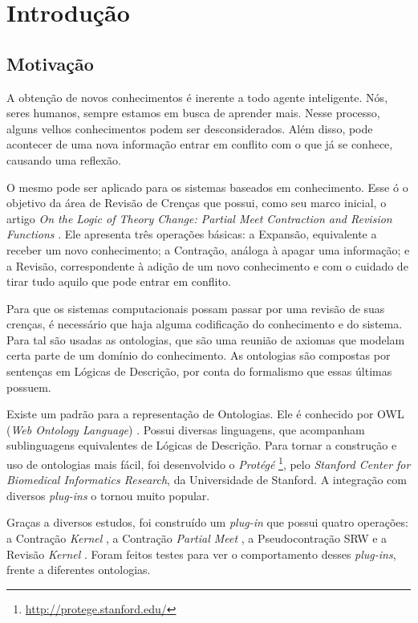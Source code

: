 \chapter{Introdução}

\section{Motivação}

A obtenção de novos conhecimentos é inerente a todo agente inteligente. Nós, seres humanos, sempre estamos em busca de aprender mais. Nesse processo, alguns velhos conhecimentos podem ser desconsiderados. Além disso, pode acontecer de uma nova informação entrar em conflito com o que já se conhece, causando uma reflexão.

O mesmo pode ser aplicado para os sistemas baseados em conhecimento. Esse ó o objetivo da área de Revisão de Crenças que possui, como seu marco inicial, o artigo \textit{On the Logic of Theory Change: Partial Meet Contraction and Revision Functions} \citep{revisaoAGM}. Ele apresenta três operações básicas: a Expansão, equivalente a receber um novo conhecimento; a Contração, análoga à apagar uma informação; e a Revisão, correspondente à adição de um novo conhecimento e com o cuidado de tirar tudo aquilo que pode entrar em conflito.

Para que os sistemas computacionais possam passar por uma revisão de suas crenças, é necessário que haja alguma codificação do conhecimento e do sistema. Para tal são usadas as ontologias, que são uma reunião de axiomas que modelam certa parte de um domínio do conhecimento. As ontologias são compostas por sentenças em Lógicas de Descrição, por conta do formalismo que essas últimas possuem.

Existe um padrão para a representação de Ontologias. Ele é conhecido por OWL (\textit{Web Ontology Language}) \citep{ferramentasOWL2}. Possui diversas linguagens, que acompanham sublinguagens equivalentes de Lógicas de Descrição. Para tornar a construção e uso de ontologias mais fácil, foi desenvolvido o \textit{Protégé} \footnote{\url{http://protege.stanford.edu/}}, pelo \textit{Stanford Center for Biomedical Informatics Research}, da Universidade de Stanford. A integração com diversos \textit{plug-ins} o tornou muito popular.  

Graças a diversos estudos, foi construído um \textit{plug-in} que possui quatro operações: a Contração \textit{Kernel} \cite{revisaoHansson5}, a Contração \textit{Partial Meet} \cite{revisaoAGM}, a Pseu\-do\-con\-tra\-ção SRW \cite{revisaoSantos} e a Revisão \textit{Kernel} \citep{revisaoRibeiro2}. Foram feitos testes para ver o comportamento desses \textit{plug-ins}, frente a diferentes ontologias.

